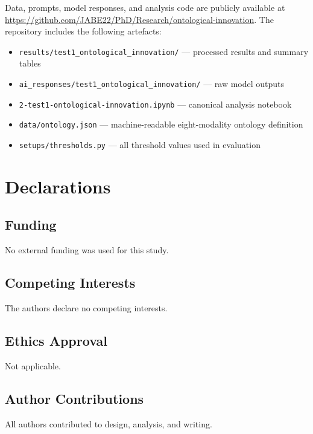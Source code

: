 \documentclass[pdflatex,sn-mathphys-num]{sn-jnl}
\begin{document}
Data, prompts, model responses, and analysis code are publicly available at
\url{https://github.com/JABE22/PhD/Research/ontological-innovation}.
The repository includes the following artefacts:
\begin{itemize}
  \item \texttt{results/test1\_ontological\_innovation/} --- processed results and summary tables
  \item \texttt{ai\_responses/test1\_ontological\_innovation/} --- raw model outputs
  \item \texttt{2-test1-ontological-innovation.ipynb} --- canonical analysis notebook
  \item \texttt{data/ontology.json} --- machine-readable eight-modality ontology definition
  \item \texttt{setups/thresholds.py} --- all threshold values used in evaluation
\end{itemize}

\section*{Declarations}

\subsection*{Funding}
No external funding was used for this study.

\subsection*{Competing Interests}
The authors declare no competing interests.

\subsection*{Ethics Approval}
Not applicable.

\subsection*{Author Contributions}
All authors contributed to design, analysis, and writing.


\end{document}
